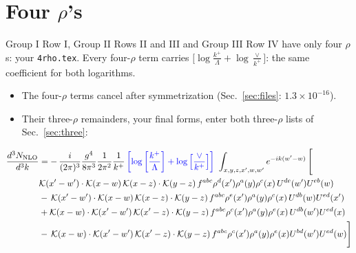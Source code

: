 \documentclass[10pt]{article}
\numberwithin{equation}{section}
\begin{document}
\section{Four \texorpdfstring{$\rho$}{rho}'s}\label{sec:four}
Group I Row I, Group II Rows II and III and Group III Row IV have only four $\rho$\textquotesingle s: your \texttt{4rho.tex}. Every four-$\rho$ term carries $\big[\log\frac{k^+}{\Lambda}+\log\frac{\vee}{k^+}\big]$: the same coefficient for both logarithms.
\begin{itemize}
\item The four-$\rho$ terms cancel after symmetrization (Sec.~\ref{sec:files}: $1.3\times10^{-16}$).
\item Their three-$\rho$ remainders, your final forms, enter both three-$\rho$ lists of Sec.~\ref{sec:three}:
\end{itemize}
\begin{align}
    \frac{d^{3}N_{\rm NLO}}{d^{3}k} & = -\,\frac{i}{(2\pi)^{3}}\frac{g^{4}}{8\pi^{3}}\frac{1}{2\pi^{2}} \frac{1}{k^{+}}\,{\color{blue}\left[\log{\left[\frac{k^{+}}{\Lambda}\right]}+\log{\left[\frac{\vee}{k^{+}}\right]}\right]}\,\,\int_{x,y,z,x^{\prime},w,w^{\prime}}e^{-ik(w^{\prime}-w)}\, \Bigg[\notag \\ &  \mathcal{K}(x'-w')\cdot \mathcal{K}(x-w)\, \mathcal{K}(x-z)\cdot \mathcal{K}(y-z)\, f^{a b c} \rho^{d}(x') \rho^{a}(y) \rho^{c}(x)\,U^{d e}(w') U^{e b}(w) \nonumber\\
    &  -\,\mathcal{K}(x'-w')\cdot \mathcal{K}(x-w)\, \mathcal{K}(x-z)\cdot \mathcal{K}(y-z)\, f^{a b c} \rho^{e}(x') \rho^{a}(y) \rho^{c}(x)\, U^{d b}(w) U^{e d}(x')\nonumber\\
    & + \mathcal{K}(x-w)\cdot \mathcal{K}(x'-w')\, \mathcal{K}(x'-z)\cdot \mathcal{K}(y-z)\, f^{a b c} \rho^{c}(x') \rho^{a}(y) \rho^{e}(x)\,U^{d b}(w') U^{e d}(x) \nonumber\\
    & -\,\mathcal{K}(x-w)\cdot \mathcal{K}(x'-w')\, \mathcal{K}(x'-z)\cdot \mathcal{K}(y-z)\, f^{a b c} \rho^{c}(x') \rho^{a}(y) \rho^{e}(x) U^{b d}(w') U^{e d}(w)\Bigg]
\label{eq:foura}
\end{align}
\end{document}
